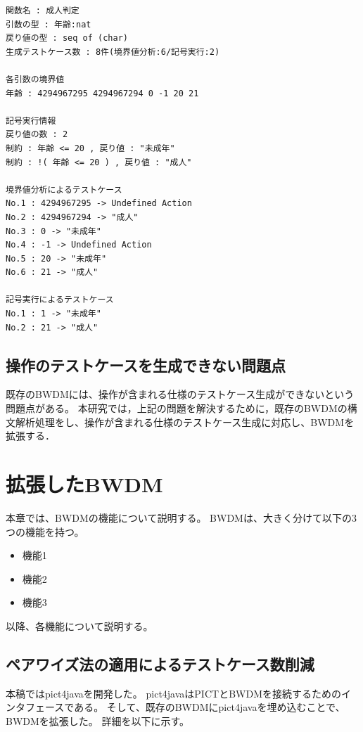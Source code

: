 \documentclass[uplatex, report, a4j, 10pt]{jsbook}
\newcommand{\tool}{BWDM}
\begin{document}
\lstset{language=}
\noindent\begin{minipage}{\textwidth}
\begin{lstlisting}[caption=コード\ref{fig:func_multiple}のVDM++仕様を既存のBWDMに適用した際の出力。,label=fig:func_multiple_result]
関数名 : 成人判定
引数の型 : 年齢:nat 
戻り値の型 : seq of (char)
生成テストケース数 : 8件(境界値分析:6/記号実行:2)

各引数の境界値
年齢 : 4294967295 4294967294 0 -1 20 21 

記号実行情報
戻り値の数 : 2
制約 : 年齢 <= 20 , 戻り値 : "未成年"
制約 : !( 年齢 <= 20 ) , 戻り値 : "成人"

境界値分析によるテストケース
No.1 : 4294967295 -> Undefined Action
No.2 : 4294967294 -> "成人"
No.3 : 0 -> "未成年"
No.4 : -1 -> Undefined Action
No.5 : 20 -> "未成年"
No.6 : 21 -> "成人"

記号実行によるテストケース
No.1 : 1 -> "未成年"
No.2 : 21 -> "成人"
\end{lstlisting}
\end{minipage}

\section{操作のテストケースを生成できない問題点}\label{sec:probrem_operation}
既存の\tool{}には、操作が含まれる仕様のテストケース生成ができないという問題点がある。
本研究では，上記の問題を解決するために，既存の\tool{}の構文解析処理をし、操作が含まれる仕様のテストケース生成に対応し、\tool{}を拡張する．



\chapter{拡張した\tool{}}\label{cha:Extended}

本章では、\tool{}の機能について説明する。
\tool{}は、大きく分けて以下の3つの機能を持つ。

\begin{itemize}
  \item 機能1
  \item 機能2
  \item 機能3
\end{itemize}

以降、各機能について説明する。

\section{ペアワイズ法の適用によるテストケース数削減}
本稿ではpict4javaを開発した。
pict4javaはPICTとBWDMを接続するためのインタフェースである。
そして、既存のBWDMにpict4javaを埋め込むことで、BWDMを拡張した。
詳細を以下に示す。
\end{document}
